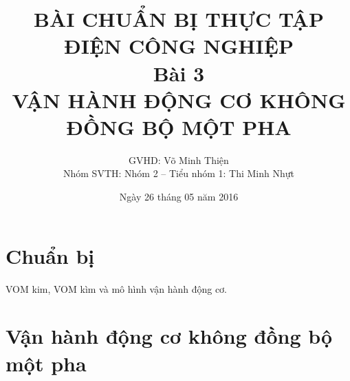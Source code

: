 \documentclass[13pt,a4paper]{extarticle}
\begin{document}
\title{\Large{\textbf{BÀI CHUẨN BỊ THỰC TẬP ĐIỆN CÔNG NGHIỆP}}\\\vspace{1cm}\textbf{Bài 3}\\\vspace{.5cm}\textbf{VẬN HÀNH ĐỘNG CƠ KHÔNG ĐỒNG BỘ MỘT PHA}}
\date{Ngày 26 tháng 05 năm 2016}
\author{GVHD: Võ Minh Thiện \vspace{.6cm}\\  Nhóm SVTH: Nhóm 2 -- Tiểu nhóm 1: Thi Minh Nhựt}
\maketitle
\tableofcontents
\newpage
{}
\setcounter{page}{1}
\section{Chuẩn bị}
VOM kim, VOM kìm và mô hình vận hành động cơ.
\section{Vận hành động cơ không đồng bộ một pha}
\end{document}
